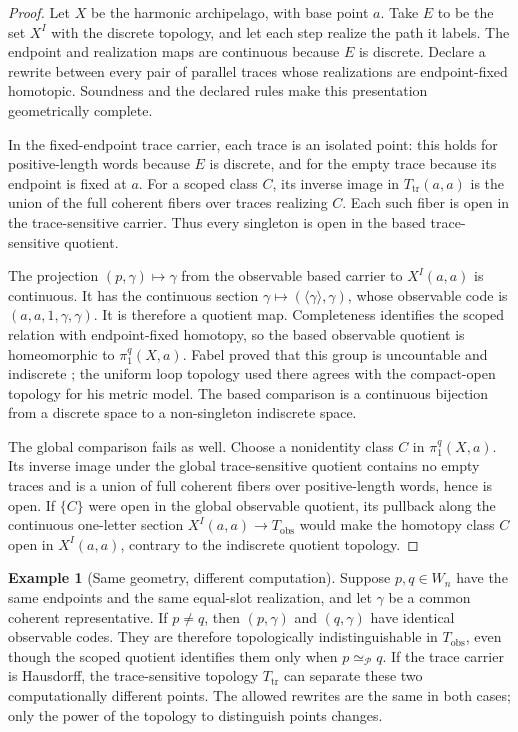 \documentclass[10pt,reqno]{amsart}
\theoremstyle{definition}
\newtheorem{example}[definition]{Example}
\theoremstyle{plain}
\theoremstyle{remark}
\newcommand{\RwEq}{\mathrel{\simeq_{\!\mathcal P}}}
\begin{document}
\begin{proof}
Let $X$ be the harmonic archipelago, with base point $a$.  Take $E$ to be the
set $X^I$ with the discrete topology, and let each step realize the path it
labels.  The endpoint and realization maps are continuous because $E$ is
discrete.  Declare a rewrite between every pair of parallel traces whose
realizations are endpoint-fixed homotopic.  Soundness and the declared rules
make this presentation geometrically complete.

In the fixed-endpoint trace carrier, each trace is an isolated point: this
holds for positive-length words because $E$ is discrete, and for the empty
trace because its endpoint is fixed at $a$.  For a scoped class $C$, its
inverse image in $T_{\mathrm{tr}}(a,a)$ is the union of the full coherent
fibers over traces realizing $C$.  Each such fiber is open in the
trace-sensitive carrier.  Thus every singleton is open in the based
trace-sensitive quotient.

The projection $(p,\gamma)\mapsto\gamma$ from the observable based carrier
to $X^I(a,a)$ is continuous.  It has the continuous section
$\gamma\mapsto(\langle\gamma\rangle,\gamma)$, whose observable code is
$(a,a,1,\gamma,\gamma)$.  It is therefore a quotient map.  Completeness
identifies the scoped relation with endpoint-fixed homotopy, so the based
observable quotient is homeomorphic to $\pi_1^q(X,a)$.  Fabel proved that
this group is uncountable and indiscrete
\cite[Corollaries~9--10]{Fabel05Archipelago}; the
uniform loop topology used there agrees with the compact-open topology for
his metric model.  The based comparison is a continuous bijection from a discrete
space to a non-singleton indiscrete space.

The global comparison fails as well.  Choose a nonidentity class $C$ in
$\pi_1^q(X,a)$.  Its inverse image under the global trace-sensitive quotient
contains no empty traces and is a union of full coherent fibers over
positive-length words, hence is open.  If $\{C\}$ were open in the global
observable quotient, its pullback along the continuous one-letter section
$X^I(a,a)\to T_{\mathrm{obs}}$ would make the homotopy class $C$ open in
$X^I(a,a)$, contrary to the indiscrete quotient topology.
\end{proof}

\begin{example}[Same geometry, different computation]
Suppose $p,q\in W_n$ have the same endpoints and the same equal-slot
realization, and let $\gamma$ be a common coherent representative.  If
$p\neq q$, then $(p,\gamma)$ and $(q,\gamma)$ have identical observable
codes.  They are therefore topologically indistinguishable in
$T_{\mathrm{obs}}$, even though the scoped quotient identifies them only when
$p\RwEq q$.  If the trace carrier is Hausdorff, the trace-sensitive topology
$T_{\mathrm{tr}}$ can separate these two computationally different points.
The allowed rewrites are the same in both cases; only the power of the
topology to distinguish points changes.
\end{example}
\end{document}
